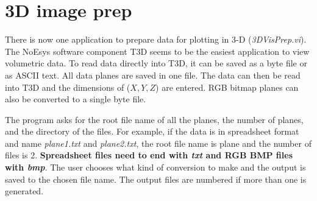 \documentclass[10pt]{article}
\begin{document}
\section{3D image prep}

There is now one application to prepare data for plotting in 3-D
({\it 3DVisPrep.vi}). The NoEsys software component T3D seems to
be the easiest application to view volumetric data. To read data
directly into T3D, it can be saved as a byte file or as ASCII
text. All data planes are saved in one file. The data can then be
read into T3D and the dimensions of ($X,Y,Z$) are entered. RGB
bitmap planes can also be converted to a single byte file.

The program asks for the root file name of all the planes, the
number of planes, and the directory of the files. For example, if
the data is in spreadsheet format and name {\it plane1.txt} and
{\it plane2.txt}, the root file name is plane and the number of
files is 2. {\bf Spreadsheet files need to end with {\it txt} and
RGB BMP files with {\it bmp}}. The user chooses what kind of
conversion to make and the output is saved to the chosen file
name. The output files are numbered if more than one is generated.
\end{document}
